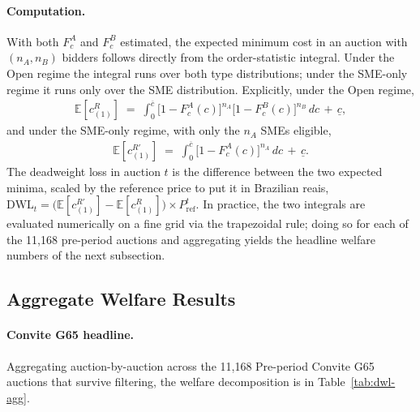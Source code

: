 \documentclass[12pt]{article}
\begin{document}
\paragraph{Computation.}
With both $F_c^A$ and $F_c^B$ estimated, the expected minimum
cost in an auction with $(n_A, n_B)$ bidders follows directly
from the order-statistic integral. Under the Open regime the
integral runs over both type distributions; under the SME-only
regime it runs only over the SME distribution. Explicitly, under
the Open regime,
\begin{align}
\mathbb{E}[c_{(1)}^{R}] \;=\;
  \int_0^{\overline{c}} \bigl[1 - F_c^A(c)\bigr]^{n_A}
                     \bigl[1 - F_c^B(c)\bigr]^{n_B}\,
   dc \,+\, \underline{c},
\label{eq:expected-min-open}
\end{align}
and under the SME-only regime, with only the $n_A$ SMEs
eligible,
\begin{align}
\mathbb{E}[c_{(1)}^{R'}] \;=\;
  \int_0^{\overline{c}} \bigl[1 - F_c^A(c)\bigr]^{n_A}\, dc
  \,+\, \underline{c}.
\label{eq:expected-min-sme}
\end{align}
The deadweight loss in auction $t$ is the difference between
the two expected minima, scaled by the reference price to put it
in Brazilian reais,
$\text{DWL}_t = \bigl(\mathbb{E}[c_{(1)}^{R'}] -
\mathbb{E}[c_{(1)}^{R}]\bigr) \times P_{\text{ref}}^t$. In
practice, the two integrals are evaluated numerically on a fine
grid via the trapezoidal rule; doing so for each of the 11{,}168
pre-period auctions and aggregating yields the headline welfare
numbers of the next subsection.

\subsection{Aggregate Welfare Results}
\label{sec:welfare-aggregate}

\paragraph{Convite G65 headline.}
Aggregating auction-by-auction across the 11{,}168 Pre-period
Convite G65 auctions that survive filtering, the welfare
decomposition is in Table~\ref{tab:dwl-agg}.
\end{document}
